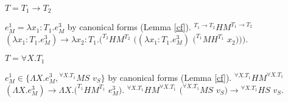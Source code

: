 \begin{case}
\begin{subcase}
\end{subcase}

\begin{subcase}

$T=T_{1}\rightarrow T_{2}$

$e_{M}^{1}=\lambda x_{1}:T_{1}.e_{M}^{3}$ by canonical forms (Lemma \ref{cf}).  $^{T_{1}\rightarrow T_{2}}HM^{T_{1}\rightarrow T_{2}}$ $(\lambda x_{1}:T_{1}.e_{M}^{3})\rightarrow\lambda x_{2}:T_{1}.(^{T_{2}}HM^{T_{2}}$ $((\lambda x_{1}:T_{1}.e_{M}^{3})$ $(^{T_{1}}MH^{T_{1}}$ $x_{2})))$.

\end{subcase}

\begin{subcase}

$T=\forall X.T_{1}$

$e_{M}^{1}\in\lbrace\Lambda X.e_{M}^{3},{^{\forall X.T_{1}}M}S$ $v_{S}\rbrace$ by canonical forms (Lemma \ref{cf}).  $^{\forall X.T_{1}}HM^{\forall X.T_{1}}$ $(\Lambda X.e_{M}^{3})\rightarrow\Lambda X.(^{T_{1}}HM^{T_{1}}$ $e_{M}^{3})$.  $^{\forall X.T_{1}}HM^{\forall X.T_{1}}$ $(^{\forall X.T_{1}}MS$ $v_{S})\rightarrow{^{\forall X.T_{1}}H}S$ $v_{S}$.

\end{subcase}

\end{case}